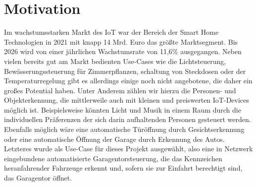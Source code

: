 \chapter{Motivation}
Im wachstumsstarken Markt des \ac{IoT} war der Bereich der Smart Home Technologien in 2021 mit knapp 14 Mrd. Euro das größte Marktsegment. \autocite{IoT} Bis 2026 wird von einer jährlichen Wachstumsrate von 11,6\% ausgegangen.\autocite{SmartHome} Neben vielen bereits gut am Markt bedienten Use-Cases wie die Lichtsteuerung, Bewässerungssteuerung für Zimmerpflanzen, schaltung von Steckdosen oder der Temperaturregelung gibt es allerdings einige noch nicht angebotene, die daher ein großes Potential haben. Unter Anderem zählen wir hierzu die Personen- und Objekterkennung, die mittlerweile auch mit kleinen und preiswerten IoT-Devices möglich ist. Beispielsweise könnten Licht und Musik in einem Raum durch die individuellen Präferenzen der sich darin aufhaltenden Personen gesteuert werden.
Ebenfalls möglich wäre eine automatische Türöffnung durch Gesichtserkennung oder eine automatische Öffnung der Garage durch Erkennung des Autos.
\newline Letzteres wurde als Use-Case für dieses Projekt ausgewählt, also eine in Netzwerk eingebundene automatisierte Garagentorsteuerung, die das Kennzeichen heranfahrender Fahrzeuge erkennt und, sofern sie zur Einfahrt berechtigt sind, das Garagentor öffnet.




